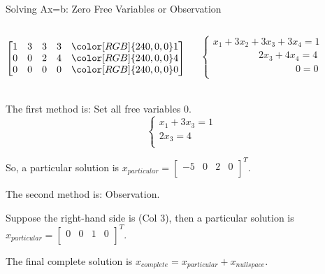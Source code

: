 \documentclass{beamer}
\begin{document}
\begin{frame}{Solving Ax=b: Zero Free Variables or Observation}
\begin{columns}
\begin{equation*}
    \left[ \begin{matrix}
        1&		3&		3&		3&		{\color[RGB]{240, 0, 0} 1}\\
        0&		0&		2&		4&		{\color[RGB]{240, 0, 0} 4}\\
        0&		0&		0&		0&		{\color[RGB]{240, 0, 0} 0}\\
    \end{matrix} \right]
\end{equation*}

\vspace{-8pt}
\begin{equation*}
    \begin{cases}
        x_1+3x_2+3x_3+3x_4=1\\
        \qquad\qquad\ \:\:2x_3+4x_4=4\\
        \qquad\qquad\qquad\qquad\:\:0=0\\
    \end{cases}
\end{equation*}
\end{columns}
The first method is: Set all free variables 0.
\begin{equation*}
    \begin{cases}
        x_1+3x_3=1\\
        2x_3=4\\
    \end{cases}
\end{equation*}

So, a particular solution is $x_{particular}=\left[ \begin{matrix}
	-5&		0&		2&		0\\
\end{matrix} \right] ^T$.

\vspace{7pt}
The second method is: Observation.

\vspace{3pt}
Suppose the right-hand side is (Col 3), then a particular solution is $x_{particular}=\left[ \begin{matrix}
	0&		0&		1&		0\\
\end{matrix} \right] ^T$.

\vspace{5pt}
The final complete solution is $x_{complete}=x_{particular}+x_{nullspace}$.
\end{frame}
\end{document}

